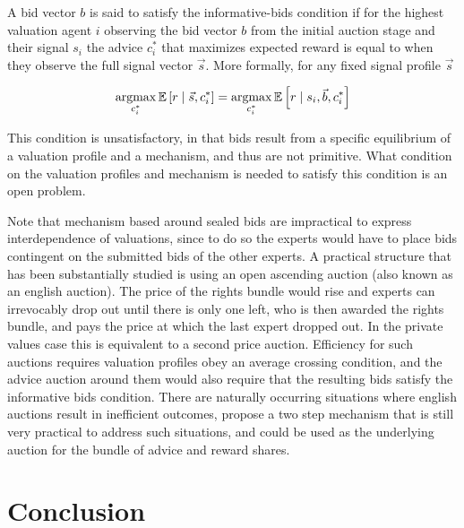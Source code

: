 \begin{defn}
	A bid vector $b$ is said to satisfy the informative-bids condition if for the highest valuation agent $i$  observing the bid vector $b$ from the initial auction stage and their signal $s_i$ the advice $c^*_i$ that maximizes expected reward is equal to when they observe the full signal vector $\vec{s}$. More formally, for any fixed signal profile $\vec{s} $  
	
$$
	 \operatorname*{argmax}_{c^{*}_{i}}  \operatorname*{\mathbb E} \left[r \mid \vec{s}, c^{*}_{i} \right] = \operatorname*{argmax}_{c^{*}_{i}}  \operatorname*{\mathbb E} \left[r \mid s_i, \vec{b}, c^{*}_{i} \right]
$$	
\end{defn}


This condition is unsatisfactory, in that bids result from a specific equilibrium of a valuation profile and a mechanism, and thus are not primitive. What condition on the valuation profiles and mechanism is needed to satisfy this condition is an open problem. 


Note that mechanism based around sealed bids are impractical to express interdependence of valuations, since to do so the experts would have to place bids contingent on the submitted bids of the other experts. A practical structure that has been substantially studied is using an open ascending auction (also known as an english auction). The price of the rights bundle would rise and experts can irrevocably drop out until there is only one left, who is then awarded the rights bundle, and pays the price at which the last expert dropped out. In the private values case this is equivalent to a second price auction. Efficiency for such auctions requires valuation profiles obey an average crossing condition, and the advice auction around them would also require that the resulting bids  satisfy the informative bids condition.
There are naturally occurring situations where english auctions result in inefficient outcomes,   \citet{hernando2018inefficient} propose a two step mechanism that is still very practical to address such situations, and could be used as the underlying auction for the bundle of advice and reward shares. 

\section{Conclusion}

